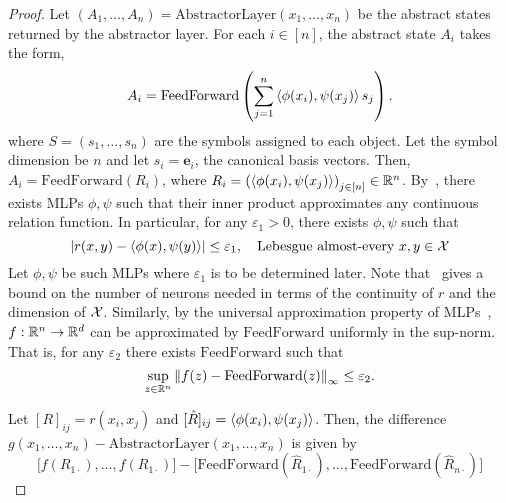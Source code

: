 \begin{proof}
    Let $(A_1, \ldots, A_n) = \mathrm{AbstractorLayer}(x_1, \ldots, x_n)$ be the abstract states returned by the abstractor layer. For each $i \in [n]$,
    the abstract state $A_i$ takes the form,
    \begin{equation*}
        A_i = \mathrm{FeedForward}\left(\sum_{j=1}^{n} \left \langle \phi(x_i), \psi(x_j) \right\rangle s_j\right).
    \end{equation*}
    where $S = (s_1, \ldots, s_n)$ are the symbols assigned to each object. Let the symbol dimension be $n$ and let $s_i = \bm{e}_i$, the canonical basis vectors. Then, $A_i = \mathrm{FeedForward}(R_i)$, where $R_i = {(\left \langle \phi(x_i), \psi(x_j) \right\rangle)}_{j \in [n]} \in \mathbb{R}^n$. By~\citep[Theorem 3.1]{altabaaApproximationRelationFunctions2024}, there exists MLPs $\phi, \psi$ such that their inner product approximates any continuous relation function. In particular, for any $\varepsilon_1 > 0$, there exists $\phi, \psi$ such that
    \begin{equation}\label{eq:approx_proof_r_approx}
        \left\lvert r(x, y) - \left \langle \phi(x), \psi(y) \right\rangle\right\rvert \leq \varepsilon_1, \quad \text{Lebesgue almost-every } x,y \in {\mathcal{X}}
    \end{equation}
    Let $\phi, \psi$ be such MLPs where $\varepsilon_1$ is to be determined later. Note that~\citep{altabaaApproximationRelationFunctions2024} gives a bound on the number of neurons needed in terms of the continuity of $r$ and the dimension of ${\mathcal{X}}$. Similarly, by the universal approximation property of MLPs~\citep[e.g.,]{cybenkoApproximationSuperpositions1989}, $f: \mathbb{R}^{n} \to \mathbb{R}^{d}$ can be approximated by $\mathrm{FeedForward}$ uniformly in the sup-norm. That is, for any $\varepsilon_2$ there exists $\mathrm{FeedForward}$ such that
    \begin{equation}\label{eq:approx_proof_f_approx}
        \sup_{z \in \mathbb{R}^n} \left\lVert f(z) - \mathrm{FeedForward}(z)\right\rVert_{\infty} \leq \varepsilon_2.
    \end{equation}

    Let $[R]_{ij} = r(x_i, x_j)$ and $[\hat{R}]_{ij} = \left \langle \phi(x_i), \psi(x_j) \right\rangle$. Then, the difference $g(x_1, \ldots, x_n) - \mathrm{AbstractorLayer}(x_1, \ldots, x_n)$ is given by
    \begin{equation}\label{eq:approx_proof_diff}
        \Big[f(R_{1\cdot}), \ldots, f(R_{1\cdot})\Big] - \Big[\mathrm{FeedForward}(\hat{R}_{1\cdot}), \ldots, \mathrm{FeedForward}(\hat{R}_{n\cdot})\Big]
    \end{equation}


\end{proof}
